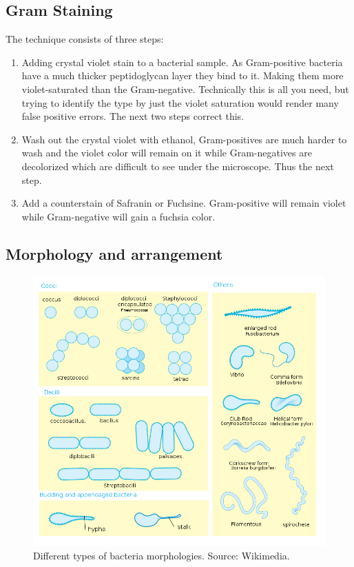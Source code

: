 \subsection{Gram Staining}

The technique consists of three steps:

    \begin{enumerate}
    
        \item Adding crystal violet stain to a bacterial sample. As Gram-positive bacteria have a much thicker peptidoglycan layer they bind to it. Making them more violet-saturated than the Gram-negative. Technically this is all you need, but trying to identify the type by just the violet saturation would render many false positive errors. The next two steps correct this.

        \item Wash out the crystal violet with ethanol, Gram-positives are much harder to wash and the violet color will remain on it while Gram-negatives are decolorized which are difficult to see under the microscope. Thus the next step.

        \item Add a counterstain of Safranin or Fuchsine. Gram-positive will remain violet while Gram-negative will gain a fuchsia color.

    \end{enumerate}

\subsection{Morphology and arrangement}

    \begin{figure}[ht]
        \centering
            \includegraphics[width=0.7\linewidth]{figures/Staph/Bacterial_morphology_diagram.svg.png} 
        \caption{Different types of bacteria morphologies. Source: Wikimedia.}
        \label{figure:bacteriashapes}
    \end{figure}

